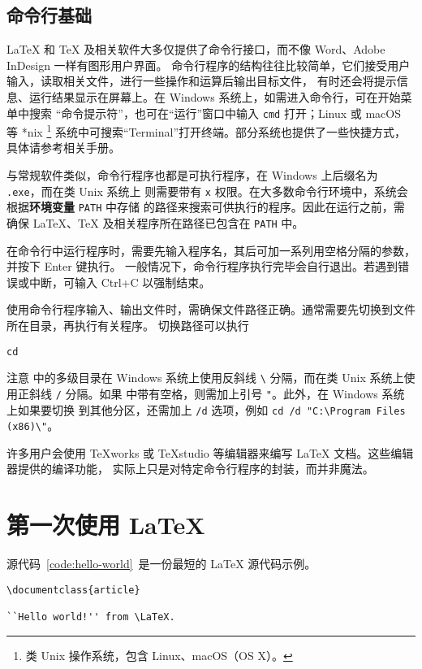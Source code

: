 \subsection{命令行基础}

\LaTeX{} 和 \TeX{} 及相关软件大多仅提供了命令行接口，而不像 Word、Adobe InDesign 一样有图形用户界面。
命令行程序的结构往往比较简单，它们接受用户输入，读取相关文件，进行一些操作和运算后输出目标文件，
有时还会将提示信息、运行结果显示在屏幕上。在 Windows 系统上，如需进入命令行，可在开始菜单中搜索
“命令提示符”，也可在“运行”窗口中输入 \texttt{cmd} 打开；Linux 或 macOS 等 *nix %
\footnote{类 Unix 操作系统，包含 Linux、macOS（OS X）。}
系统中可搜索“Terminal”打开终端。部分系统也提供了一些快捷方式，具体请参考相关手册。

与常规软件类似，命令行程序也都是可执行程序，在 Windows 上后缀名为 \texttt{.exe}，而在类 Unix 系统上
则需要带有 \texttt{x} 权限。在大多数命令行环境中，系统会根据\textbf{环境变量} \texttt{PATH} 中存储
的路径来搜索可供执行的程序。因此在运行之前，需确保 \LaTeX 、\TeX{} 及相关程序所在路径已包含在
\texttt{PATH} 中。

在命令行中运行程序时，需要先输入程序名，其后可加一系列用空格分隔的参数，并按下 Enter 键执行。
一般情况下，命令行程序执行完毕会自行退出。若遇到错误或中断，可输入 Ctrl+C 以强制结束。

使用命令行程序输入、输出文件时，需确保文件路径正确。通常需要先切换到文件所在目录，再执行有关程序。
切换路径可以执行
\begin{command}
\verb|cd| 
\end{command}
注意  中的多级目录在 Windows 系统上使用反斜线 \verb|\| 分隔，而在类 Unix 系统上使用正斜线
\verb|/| 分隔。如果  中带有空格，则需加上引号 \verb|"|。此外，在 Windows 系统上如果要切换
到其他分区，还需加上 \verb|/d| 选项，例如 \verb|cd /d "C:\Program Files (x86)\"|。

许多用户会使用 TeXworks 或 TeXstudio 等编辑器来编写 \LaTeX{} 文档。这些编辑器提供的编译功能，
实际上只是对特定命令行程序的封装，而并非魔法。

\section{第一次使用 \LaTeX}\label{sec:run}

源代码~\ref{code:hello-world}~是一份最短的 \LaTeX{} 源代码示例。

\begin{sourcecode}[htp]
\begin{Verbatim}
\documentclass{article}

``Hello world!'' from \LaTeX.

\end{Verbatim}
\caption{\LaTeX{} 的一个最简单的源代码示例。}\label{code:hello-world}
\end{sourcecode}

